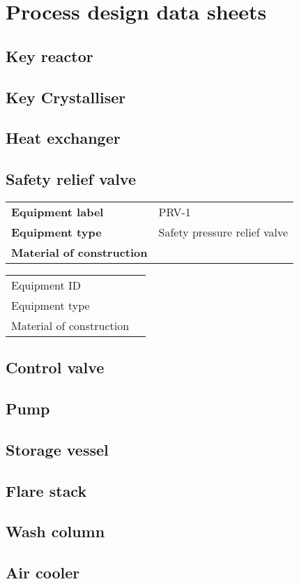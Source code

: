 \section{Process design data sheets}

\subsection{Key reactor}

\subsection{Key Crystalliser}

\subsection{Heat exchanger}

\subsection{Safety relief valve}

\begin{table}[H]
    \centering
    \begin{tabular}{@{}l|l@{}}
    \toprule
      \textbf{Equipment label}  & PRV-1 \\
       \textbf{Equipment type}  & Safety pressure relief valve \\
       \textbf{Material of construction} & \\
       \bottomrule
    \end{tabular}
\end{table}

\begin{table}[H]
    \centering
    \begin{tabular}{@{}l|l@{}}
    \toprule
       Equipment ID  &  \\
       Equipment type  &  \\
       Material of construction & \\
       \bottomrule
    \end{tabular}
\end{table}

\subsection{Control valve}

\subsection{Pump}

\subsection{Storage vessel}

\subsection{Flare stack}

\subsection{Wash column}

\subsection{Air cooler}


